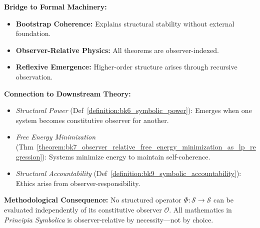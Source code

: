 \begin{tcolorbox}[title=Foundational Scholium — The Constitutive Reflex, colback=blue!5!white, colframe=blue!75!black, fonttitle=\bfseries]
\textbf{Bridge to Formal Machinery:}
\begin{itemize}
\item \textbf{Bootstrap Coherence:} Explains structural stability without external foundation.
\item \textbf{Observer-Relative Physics:} All theorems are observer-indexed.
\item \textbf{Reflexive Emergence:} Higher-order structure arises through recursive observation.
\end{itemize}

\textbf{Connection to Downstream Theory:}
\begin{itemize}
\item \emph{Structural Power} (Def~\ref{definition:bk6_symbolic_power}): Emerges when one system becomes constitutive observer for another.
\item \emph{Free Energy Minimization} (Thm~\ref{theorem:bk7_observer_relative_free_energy_minimization_as_lp_regression}): Systems minimize energy to maintain self-coherence.
\item \emph{Structural Accountability} (Def~\ref{definition:bk9_symbolic_accountability}): Ethics arise from observer-responsibility.
\end{itemize}

\textbf{Methodological Consequence:} No structured operator $\Phi: \mathcal{S} \to \mathcal{S}$ can be evaluated independently of its constitutive observer $\mathcal{O}$. All mathematics in \emph{Principia Symbolica} is observer-relative by necessity—not by choice.

\end{tcolorbox}

